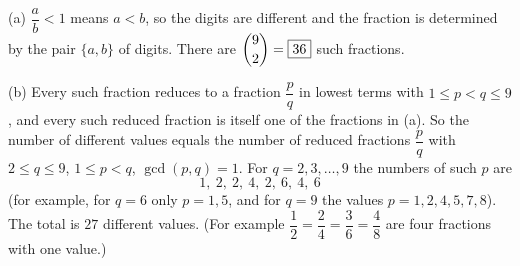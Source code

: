 (a) $\dfrac {a}{b}<1$ means $a<b$, so the digits are different and the fraction is determined by the pair $\{a,b\}$ of digits. There are $\dbinom92=\boxed{36}$ such fractions.

(b) Every such fraction reduces to a fraction $\dfrac {p}{q}$ in lowest terms with $1\le p<q\le9$, and every such reduced fraction is itself one of the fractions in (a). So the number of different values equals the number of reduced fractions $\dfrac {p}{q}$ with $2\le q\le9$, $1\le p<q$, $\gcd(p,q)=1$. For $q=2,3,\dots,9$ the numbers of such $p$ are
\[
1,\ 2,\ 2,\ 4,\ 2,\ 6,\ 4,\ 6
\]
(for example, for $q=6$ only $p=1,5$, and for $q=9$ the values $p=1,2,4,5,7,8$). The total is $\boxed{27}$ different values. (For example $\dfrac{1}{2}=\dfrac{2}{4}=\dfrac{3}{6}=\dfrac{4}{8}$ are four fractions with one value.)
